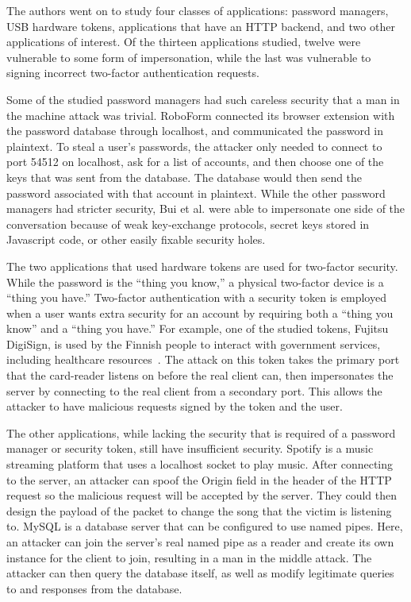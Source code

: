 The authors went on to study four classes of applications: password managers, USB hardware tokens, applications that have an HTTP backend, and two other applications of interest.  Of the thirteen applications studied, twelve were vulnerable to some form of impersonation, while the last was vulnerable to signing incorrect two-factor authentication requests.

Some of the studied password managers had such careless security that a man in the machine attack was trivial.  RoboForm connected its browser extension with the password database through localhost, and communicated the password in plaintext.  To steal a user's passwords, the attacker only needed to connect to port 54512 on localhost, ask for a list of accounts, and then choose one of the keys that was sent from the database.  The database would then send the password associated with that account in plaintext.  While the other password managers had stricter security, Bui et al. were able to impersonate one side of the conversation because of weak key-exchange protocols, secret keys stored in Javascript code, or other easily fixable security holes.

The two applications that used hardware tokens are used for two-factor security.  While the password is the ``thing you know,'' a physical two-factor device is a ``thing you have.''  Two-factor authentication with a security token is employed when a user wants extra security for an account by requiring both a ``thing you know'' and a ``thing you have.''  For example, one of the studied tokens, Fujitsu DigiSign, is used by the Finnish people to interact with government services, including healthcare resources~\cite{MitMa}.  The attack on this token takes the primary port that the card-reader listens on before the real client can, then impersonates the server by connecting to the real client from a secondary port.  This allows the attacker to have malicious requests signed by the token and the user.

The other applications, while lacking the security that is required of a password manager or security token, still have insufficient security.  Spotify is a music streaming platform that uses a localhost socket to play music.  After connecting to the server, an attacker can spoof the Origin field in the header of the HTTP request so the malicious request will be accepted by the server.  They could then design the payload of the packet to change the song that the victim is listening to.  MySQL is a database server that can be configured to use named pipes.  Here, an attacker can join the server's real named pipe as a reader and create its own instance for the client to join, resulting in a man in the middle attack.  The attacker can then query the database itself, as well as modify legitimate queries to and responses from the database.

